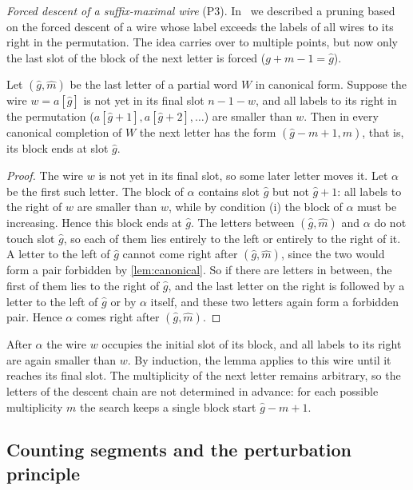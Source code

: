 \emph{Forced descent of a suffix-maximal wire} (P3). In~\cite[Appendix~B.1]{pu26b} we described a pruning based on the forced descent of a wire whose label exceeds the labels of all wires to its right in the permutation. The idea carries over to multiple points, but now only the last slot of the block of the next letter is forced ($g+m-1=\widehat g$).

\begin{lemma}\label{lem:forced-descent}
Let $(\widehat g,\widehat m)$ be the last letter of a partial word $W$ in canonical form. Suppose the wire $w=a[\widehat g]$ is not yet in its final slot $n-1-w$, and all labels to its right in the permutation ($a[\widehat g+1],a[\widehat g+2],\ldots$) are smaller than $w$. Then in every canonical completion of $W$ the next letter has the form $(\widehat g-m+1,m)$, that is, its block ends at slot $\widehat g$.
\end{lemma}

\begin{proof}
The wire $w$ is not yet in its final slot, so some later letter moves it. Let $\alpha$ be the first such letter.
The block of $\alpha$ contains slot $\widehat g$ but not $\widehat g+1$: all labels to the right of $w$ are smaller than $w$, while by condition (i) the block of $\alpha$ must be increasing. Hence this block ends at $\widehat g$. The letters between $(\widehat g,\widehat m)$ and $\alpha$ do not touch slot $\widehat g$, so each of them lies entirely to the left or entirely to the right of it. A letter to the left of $\widehat g$ cannot come right after $(\widehat g,\widehat m)$, since the two would form a pair forbidden by \cref{lem:canonical}. So if there are letters in between, the first of them lies to the right of $\widehat g$, and the last letter on the right is followed by a letter to the left of $\widehat g$ or by $\alpha$ itself, and these two letters again form a forbidden pair. Hence $\alpha$ comes right after $(\widehat g,\widehat m)$.
\end{proof}

After $\alpha$ the wire $w$ occupies the initial slot of its block, and all labels to its right are again smaller than $w$. By induction, the lemma applies to this wire until it reaches its final slot. The multiplicity of the next letter remains arbitrary, so the letters of the descent chain are not determined in advance: for each possible multiplicity $m$ the search keeps a single block start $\widehat g-m+1$.

\subsection{Counting segments and the perturbation principle}\label{sec:segment-count}

